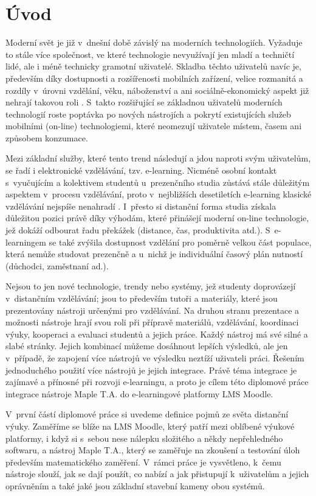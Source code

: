 \documentclass[
print,
  11pt,
  table,   
  nolof,    
  nolot,
  oneside,final
]{fithesis3}
\begin{document}
\chapter{Úvod}


Moderní svět je již v~dnešní době závislý na moderních technologiích. Vyžaduje to stále více společnost, ve které technologie nevyužívají jen mladí a techničtí lidé, ale i méně technicky gramotní uživatelé. Skladba těchto uživatelů navíc je, především díky dostupnosti a rozšířenosti mobilních zařízení, velice rozmanitá a rozdíly v~úrovni vzdělání, věku, náboženství a ani sociálně-ekonomický aspekt již nehrají takovou roli \cite{itustats}. S~takto rozšiřující se základnou uživatelů moderních technologií roste poptávka po nových nástrojích a pokrytí existujících služeb mobilními (on-line) technologiemi, které neomezují uživatele místem, časem ani způsobem konzumace.


Mezi základní služby, které tento trend následují a jdou naproti svým uživatelům, se řadí i elektronické vzdělávání, tzv. e-learning. Nicméně osob\-ní kontakt s~vyučujícím a kolektivem studentů u~prezenčního studia zůstává stále důležitým aspektem v~procesu vzdělávání, proto v~nejbližších desetiletích e-learning klasické vzdělávání nejspíše nenahradí \cite{techvsteach}. I~přesto si distanční forma studia získala důležitou pozici právě díky výhodám, které přinášejí moderní on-line technologie, jež dokáží odbourat řadu překážek (distance, čas, produktivita atd.). S~e-learningem se také zvýšila dostupnost vzdělání pro poměrně velkou část populace, která nemůže studovat prezenčně a u~nichž je individuální časový plán nutností (důchodci, zaměstnaní ad.).

Nejsou to jen nové technologie, trendy nebo systémy, jež studenty doprovázejí v~distančním vzdělávání; jsou to především tutoři a materiály, které jsou prezentovány nástroji určenými pro vzdělávání. Na druhou stranu prezentace a možnosti nástroje hrají svou roli při přípravě materiálů, vzdělávání, koordinaci výuky, kooperaci a evaluaci studentů a jejich práce. Každý nástroj má své silné a slabé stránky. Jejich kombinací můžeme dosáhnout lepších výsledků, ale jen v~případě, že zapojení více nástrojů ve výsledku neztíží uživateli práci. Řešením jednoduchého použití více nástrojů je jejich integrace. Právě téma integrace je zajímavé a přínosné při rozvoji e-learningu, a proto je cílem této diplomové práce integrace nástroje Maple T.A. do e-learn\-ingové platformy LMS Moodle.

V~první částí diplomové práce si uvedeme definice pojmů ze světa distan\-ční výuky. Zaměříme se blíže na LMS Moodle, který patří mezi oblíbené výukové platformy, i když si s~sebou nese nálepku složitého a někdy nepřehledného softwaru, a nástroj Maple T.A., který se zaměřuje na zkoušení a testování úloh především matematického zaměření. V~rámci práce je vysvětleno, k~čemu nástroje slouží, jak se dají použít, co nabízí a jak přistupují k~uživatelům a jejich oprávněním a také jaké jsou základní stavební kameny obou systémů.
\end{document}
